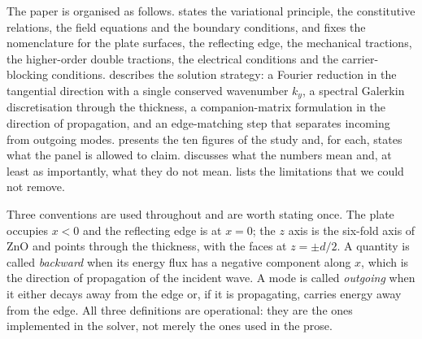 The paper is organised as follows.   states the
variational principle, the constitutive relations, the field equations and the
boundary conditions, and fixes the nomenclature for the plate surfaces, the
reflecting edge, the mechanical tractions, the higher-order double tractions,
the electrical conditions and the carrier-blocking conditions.
 describes the solution strategy: a Fourier reduction in the
tangential direction with a single conserved wavenumber $k_y$, a spectral
Galerkin discretisation through the thickness, a companion-matrix formulation
in the direction of propagation, and an edge-matching step that separates
incoming from outgoing modes.
 presents the ten figures of the study and, for each, states
what the panel is allowed to claim.   discusses what the
numbers mean and, at least as importantly, what they do not mean.
 lists the limitations that we could not remove.

Three conventions are used throughout and are worth stating once.  The plate
occupies $x<0$ and the reflecting edge is at $x=0$; the $z$ axis is the
six-fold axis of ZnO and points through the thickness, with the faces at
$z=\pm d/2$.  A quantity is called \emph{backward} when its energy flux has a
negative component along $x$, which is the direction of propagation of the
incident wave.  A mode is called \emph{outgoing} when it either decays away
from the edge or, if it is propagating, carries energy away from the edge.
All three definitions are operational: they are the ones implemented in the
solver, not merely the ones used in the prose.

